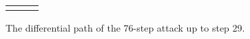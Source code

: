\begin{figure}
\begin{tabular}{lcc}
$$%
\end{tabular}
\caption{The differential path of the 76-step attack up to step 29.\label{fig:diff_path76}}
\end{figure}

